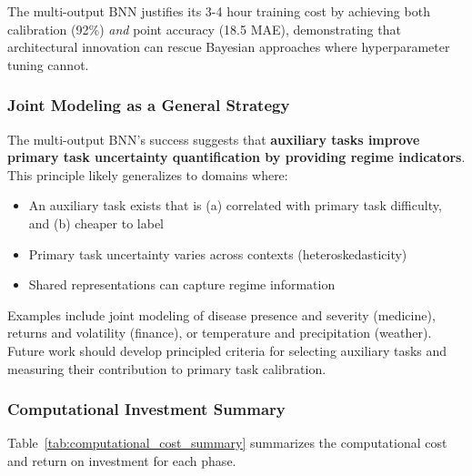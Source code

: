 The multi-output BNN justifies its 3-4 hour training cost by achieving both calibration (92\%) \textit{and} point accuracy (18.5 MAE), demonstrating that architectural innovation can rescue Bayesian approaches where hyperparameter tuning cannot.

\subsubsection{Joint Modeling as a General Strategy}

The multi-output BNN's success suggests that \textbf{auxiliary tasks improve primary task uncertainty quantification by providing regime indicators}. This principle likely generalizes to domains where:

\begin{itemize}
    \item An auxiliary task exists that is (a) correlated with primary task difficulty, and (b) cheaper to label
    \item Primary task uncertainty varies across contexts (heteroskedasticity)
    \item Shared representations can capture regime information
\end{itemize}

Examples include joint modeling of disease presence and severity (medicine), returns and volatility (finance), or temperature and precipitation (weather). Future work should develop principled criteria for selecting auxiliary tasks and measuring their contribution to primary task calibration.

\subsubsection{Computational Investment Summary}

Table~\ref{tab:computational_cost_summary} summarizes the computational cost and return on investment for each phase.

